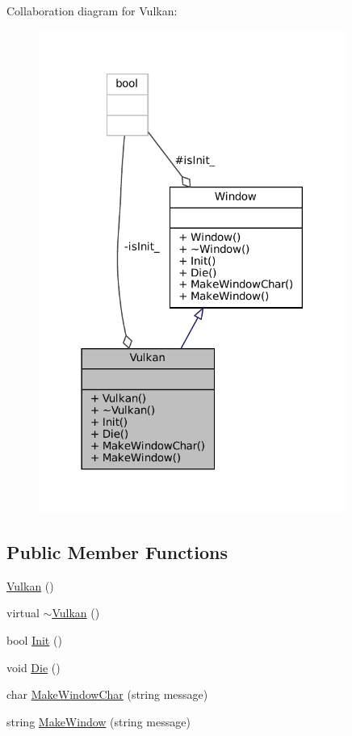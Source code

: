 Collaboration diagram for Vulkan\+:
\nopagebreak
\begin{figure}[H]
\begin{center}
\leavevmode
\includegraphics[width=285pt]{classVulkan__coll__graph}
\end{center}
\end{figure}
\subsection*{Public Member Functions}
\begin{DoxyCompactItemize}
\item 
\mbox{\hyperlink{classVulkan_a69c8a0222ecd2f24887acc75a7ffd922}{Vulkan}} ()
\item 
virtual \mbox{\hyperlink{classVulkan_a85f20d6cd141ec9568d812cfdf81971f}{$\sim$\+Vulkan}} ()
\item 
bool \mbox{\hyperlink{classVulkan_a308c68e03405bc740435a2af62cc7434}{Init}} ()
\item 
void \mbox{\hyperlink{classVulkan_a728e47da1e42d65c6d9efa5106f6d13b}{Die}} ()
\item 
char \mbox{\hyperlink{classVulkan_a70565678cd6771ac57706ff8586e256f}{Make\+Window\+Char}} (string message)
\item 
string \mbox{\hyperlink{classVulkan_a46c4ec53f8960a1fa3f3eb63d7755654}{Make\+Window}} (string message)
\end{DoxyCompactItemize}
